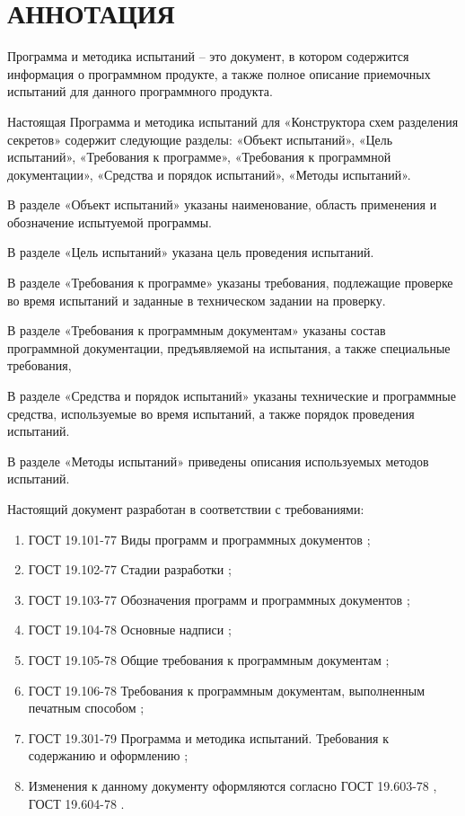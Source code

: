 \section*{АННОТАЦИЯ}

Программа и методика испытаний – это документ, в котором содержится информация о
программном продукте, а также полное описание приемочных испытаний для данного
программного продукта.

Настоящая Программа и методика испытаний для «Конструктора схем разделения секретов»
содержит следующие разделы: «Объект испытаний», «Цель испытаний», «Требования к
программе», «Требования к программной документации», «Средства и порядок испытаний»,
«Методы испытаний».

В разделе «Объект испытаний» указаны наименование, область применения и обозначение
испытуемой программы.

В разделе «Цель испытаний» указана цель проведения испытаний.

В разделе «Требования к программе» указаны требования, подлежащие проверке во время
испытаний и заданные в техническом задании на проверку.

В разделе «Требования к программным документам» указаны состав программной
документации, предъявляемой на испытания, а также специальные требования,

В разделе «Средства и порядок испытаний» указаны технические и программные средства,
используемые во время испытаний, а также порядок проведения испытаний.

В разделе «Методы испытаний» приведены описания используемых методов испытаний.

Настоящий документ разработан в соответствии с требованиями:
\begin{enumerate}[1)]
	\item ГОСТ 19.101-77 Виды программ и программных документов \cite{gost:19.101-77};
	\item ГОСТ 19.102-77 Стадии разработки \cite{gost:19.102-77};
	\item ГОСТ 19.103-77 Обозначения программ и программных документов \cite{gost:19.103-77};
	\item ГОСТ 19.104-78 Основные надписи \cite{gost:19.104-78};
	\item ГОСТ 19.105-78 Общие требования к программным документам \cite{gost:19.105-78};
	\item ГОСТ 19.106-78 Требования к программным документам, выполненным печатным способом \cite{gost:19.106-78};
	\item ГОСТ 19.301-79 Программа и методика испытаний. Требования к содержанию и оформлению \cite{gost:19.301-79};
	\item Изменения к данному документу оформляются согласно ГОСТ 19.603-78 \cite{gost:19.603-78}, ГОСТ 19.604-78 \cite{gost:19.604-78}.
\end{enumerate}

\clearpage